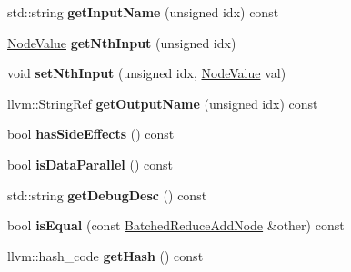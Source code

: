 \begin{DoxyCompactItemize}
std\+::string {\bfseries get\+Input\+Name} (unsigned idx) const
\item 
\mbox{\label{classglow_1_1_batched_reduce_add_node_a2aed2b95694ec75b7ffc755bde615e9b}} 
\hyperlink{structglow_1_1_node_value}{Node\+Value} {\bfseries get\+Nth\+Input} (unsigned idx)
\item 
\mbox{\label{classglow_1_1_batched_reduce_add_node_afa5066ba54dd335558ef602361cb10bd}} 
void {\bfseries set\+Nth\+Input} (unsigned idx, \hyperlink{structglow_1_1_node_value}{Node\+Value} val)
\item 
\mbox{\label{classglow_1_1_batched_reduce_add_node_a341b4e10f381737e1630820fb3916af8}} 
llvm\+::\+String\+Ref {\bfseries get\+Output\+Name} (unsigned idx) const
\item 
\mbox{\label{classglow_1_1_batched_reduce_add_node_aeb2624c0bb9161f7bffb88148aad1748}} 
bool {\bfseries has\+Side\+Effects} () const
\item 
\mbox{\label{classglow_1_1_batched_reduce_add_node_a2592f71e4c0fa8eb219688b3c15e0e77}} 
bool {\bfseries is\+Data\+Parallel} () const
\item 
\mbox{\label{classglow_1_1_batched_reduce_add_node_a8aceb46a469c40444e7be8c814788432}} 
std\+::string {\bfseries get\+Debug\+Desc} () const
\item 
\mbox{\label{classglow_1_1_batched_reduce_add_node_a42b835c7bdb8ce103e33757d12576731}} 
bool {\bfseries is\+Equal} (const \hyperlink{classglow_1_1_batched_reduce_add_node}{Batched\+Reduce\+Add\+Node} \&other) const
\item 
\mbox{\label{classglow_1_1_batched_reduce_add_node_a3fcc6f6eb2877de555aad46758a5dbc3}} 
llvm\+::hash\+\_\+code {\bfseries get\+Hash} () const
\item 
\mbox{\label{classglow_1_1_batched_reduce_add_node_ac07c0d1563db1af6b6606043c1035c39}} 

\end{DoxyCompactItemize}
